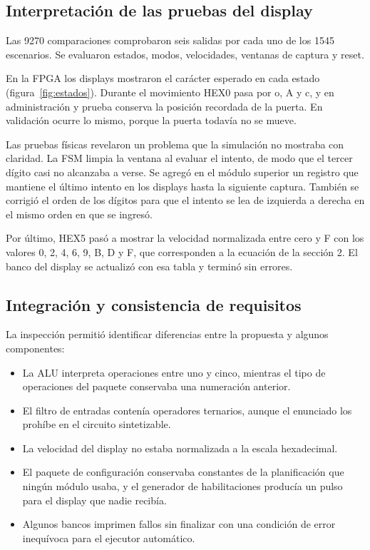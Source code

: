 \documentclass[12pt,letterpaper]{article}
\begin{document}
\subsection{Interpretación de las pruebas del display}

Las 9270 comparaciones comprobaron seis salidas por
cada uno de los 1545 escenarios. Se evaluaron estados,
modos, velocidades, ventanas de captura y reset.

En la FPGA los displays mostraron el carácter esperado en
cada estado (figura~\ref{fig:estados}). Durante el
movimiento HEX0 pasa por o, A y c, y en administración y
prueba conserva la posición recordada de la puerta. En
validación ocurre lo mismo, porque la puerta todavía no
se mueve.

Las pruebas físicas revelaron un problema que la
simulación no mostraba con claridad. La FSM limpia la
ventana al evaluar el intento, de modo que el tercer
dígito casi no alcanzaba a verse. Se agregó en el módulo
superior un registro que mantiene el último intento en
los displays hasta la siguiente captura. También se
corrigió el orden de los dígitos para que el intento se
lea de izquierda a derecha en el mismo orden en que se
ingresó.

Por último, HEX5 pasó a mostrar la velocidad normalizada
entre cero y F con los valores 0, 2, 4, 6, 9, B, D y F,
que corresponden a la ecuación de la sección 2. El banco
del display se actualizó con esa tabla y terminó sin
errores.

\subsection{Integración y consistencia de requisitos}

La inspección permitió identificar diferencias entre
la propuesta y algunos componentes:

\begin{itemize}
    \item La ALU interpreta operaciones entre uno y cinco,
    mientras el tipo de operaciones del paquete conservaba
    una numeración anterior.
    \item El filtro de entradas contenía operadores
    ternarios, aunque el enunciado los prohíbe en el
    circuito sintetizable.
    \item La velocidad del display no estaba normalizada
    a la escala hexadecimal.
    \item El paquete de configuración conservaba constantes
    de la planificación que ningún módulo usaba, y el
    generador de habilitaciones producía un pulso para el
    display que nadie recibía.
    \item Algunos bancos imprimen fallos sin finalizar
    con una condición de error inequívoca para el
    ejecutor automático.
\end{itemize}
\end{document}
